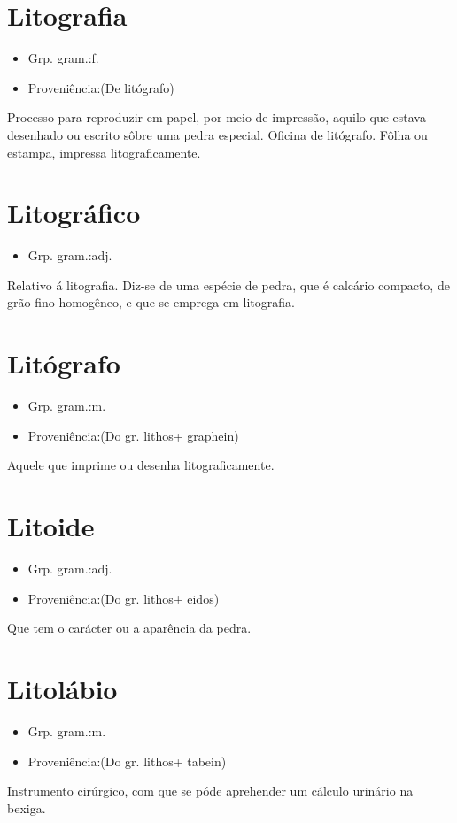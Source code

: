 \section{Litografia}
\begin{itemize}
\item {Grp. gram.:f.}
\end{itemize}
\begin{itemize}
\item {Proveniência:(De \textunderscore litógrafo\textunderscore )}
\end{itemize}
Processo para reproduzir em papel, por meio de impressão, aquilo que estava desenhado ou escrito sôbre uma pedra especial.
Oficina de litógrafo.
Fôlha ou estampa, impressa litograficamente.
\section{Litográfico}
\begin{itemize}
\item {Grp. gram.:adj.}
\end{itemize}
Relativo á litografia.
Diz-se de uma espécie de pedra, que é calcário compacto, de grão fino homogêneo, e que se emprega em litografia.
\section{Litógrafo}
\begin{itemize}
\item {Grp. gram.:m.}
\end{itemize}
\begin{itemize}
\item {Proveniência:(Do gr. \textunderscore lithos\textunderscore  + \textunderscore graphein\textunderscore )}
\end{itemize}
Aquele que imprime ou desenha litograficamente.
\section{Litoide}
\begin{itemize}
\item {Grp. gram.:adj.}
\end{itemize}
\begin{itemize}
\item {Proveniência:(Do gr. \textunderscore lithos\textunderscore  + \textunderscore eidos\textunderscore )}
\end{itemize}
Que tem o carácter ou a aparência da pedra.
\section{Litolábio}
\begin{itemize}
\item {Grp. gram.:m.}
\end{itemize}
\begin{itemize}
\item {Proveniência:(Do gr. \textunderscore lithos\textunderscore  + \textunderscore tabein\textunderscore )}
\end{itemize}
Instrumento cirúrgico, com que se póde aprehender um cálculo urinário na bexiga.
